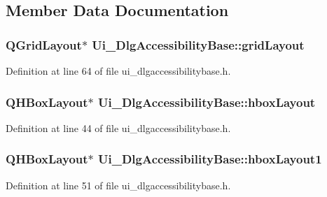 \subsection{Member Data Documentation}
\hypertarget{classUi__DlgAccessibilityBase_a5f8944bbf69c844201c6fbfc3436c89b}{
\subsubsection[{grid\+Layout}]{\setlength{\rightskip}{0pt plus 5cm}Q\+Grid\+Layout$\ast$ Ui\+\_\+\+Dlg\+Accessibility\+Base\+::grid\+Layout}}\label{classUi__DlgAccessibilityBase_a5f8944bbf69c844201c6fbfc3436c89b}


Definition at line 64 of file ui\+\_\+dlgaccessibilitybase.\+h.

\hypertarget{classUi__DlgAccessibilityBase_aeeb2f92b0e4ffd3005446d6624d5cafe}{
\subsubsection[{hbox\+Layout}]{\setlength{\rightskip}{0pt plus 5cm}Q\+H\+Box\+Layout$\ast$ Ui\+\_\+\+Dlg\+Accessibility\+Base\+::hbox\+Layout}}\label{classUi__DlgAccessibilityBase_aeeb2f92b0e4ffd3005446d6624d5cafe}


Definition at line 44 of file ui\+\_\+dlgaccessibilitybase.\+h.

\hypertarget{classUi__DlgAccessibilityBase_a4d5ca775c1e4087efb03762789a88ec7}{
\subsubsection[{hbox\+Layout1}]{\setlength{\rightskip}{0pt plus 5cm}Q\+H\+Box\+Layout$\ast$ Ui\+\_\+\+Dlg\+Accessibility\+Base\+::hbox\+Layout1}}\label{classUi__DlgAccessibilityBase_a4d5ca775c1e4087efb03762789a88ec7}


Definition at line 51 of file ui\+\_\+dlgaccessibilitybase.\+h.

